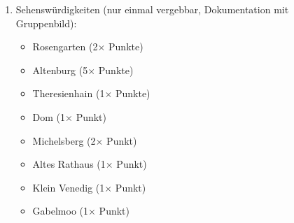 \documentclass[a5paper,ngerman]{scrartcl}
\begin{document}
\begin{enumerate}
\begin{multicols}{2}
    \end{multicols}
\item Sehenswürdigkeiten (nur einmal vergebbar, Dokumentation mit Gruppenbild):
    \begin{multicols}{2}
    \begin{itemize}
    \setlength\itemsep{0em}
    \item Rosengarten (2$\times$ Punkte)
    \item Altenburg (5$\times$ Punkte)
    \item Theresienhain (1$\times$ Punkte)
    \item Dom (1$\times$ Punkt)
    \item Michelsberg (2$\times$ Punkt)
    \item Altes Rathaus (1$\times$ Punkt)
    \item Klein Venedig (1$\times$ Punkt)
    \item Gabelmoo (1$\times$ Punkt)
    \end{itemize}
    \end{multicols}
\end{enumerate}
\end{document}
